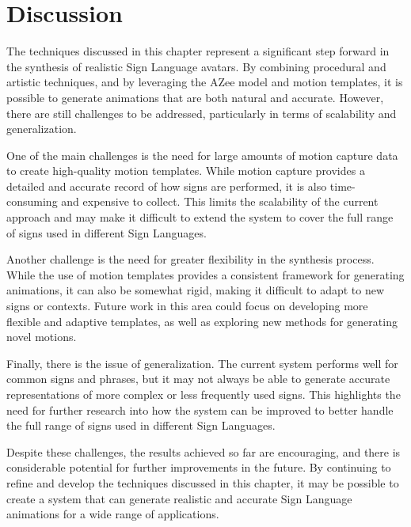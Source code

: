 \documentclass[../../main.tex]{subfiles}
\begin{document}
\section{Discussion}
\label{sec:discussion}

The techniques discussed in this chapter represent a significant step forward in the synthesis of realistic Sign Language avatars. By combining procedural and artistic techniques, and by leveraging the AZee model and motion templates, it is possible to generate animations that are both natural and accurate. However, there are still challenges to be addressed, particularly in terms of scalability and generalization.

One of the main challenges is the need for large amounts of motion capture data to create high-quality motion templates. While motion capture provides a detailed and accurate record of how signs are performed, it is also time-consuming and expensive to collect. This limits the scalability of the current approach and may make it difficult to extend the system to cover the full range of signs used in different Sign Languages.

Another challenge is the need for greater flexibility in the synthesis process. While the use of motion templates provides a consistent framework for generating animations, it can also be somewhat rigid, making it difficult to adapt to new signs or contexts. Future work in this area could focus on developing more flexible and adaptive templates, as well as exploring new methods for generating novel motions.

Finally, there is the issue of generalization. The current system performs well for common signs and phrases, but it may not always be able to generate accurate representations of more complex or less frequently used signs. This highlights the need for further research into how the system can be improved to better handle the full range of signs used in different Sign Languages.

Despite these challenges, the results achieved so far are encouraging, and there is considerable potential for further improvements in the future. By continuing to refine and develop the techniques discussed in this chapter, it may be possible to create a system that can generate realistic and accurate Sign Language animations for a wide range of applications.
\end{document}
